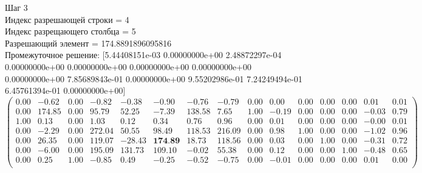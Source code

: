 \documentclass{article}
\begin{document}
\begin{flushleft}
    Шаг 3\\
    Индекс разрешающей строки = 4\\
    Индекс разрещающего столбца = 5\\
    Разрешающий элемент = 174.8891896095816\\
    Промежуточное решение:
    [5.44408151e-03 0.00000000e+00 2.48872297e-04 0.00000000e+00
    0.00000000e+00 0.00000000e+00 0.00000000e+00 0.00000000e+00
    7.85689843e-01 0.00000000e+00 9.55202986e-01 7.24249494e-01
    6.45761394e-01 0.00000000e+00]
\begin{equation*}
\begin{pmatrix}
 0.00 &  -0.62 & 0.00 &  -0.82 &  -0.38 &  -0.90 &  -0.76 &  -0.79 & 0.00 &  0.00 & 0.00 & 0.00 & 0.00 &  0.01 & 0.01 \\
 0.00 & 174.85 & 0.00 &  95.79 &  52.25 &  -7.39 & 138.58 &   7.65 & 1.00 & -0.19 & 0.00 & 0.00 & 0.00 & -0.03 & 0.79 \\
 1.00 &   0.13 & 0.00 &   1.03 &   0.12 &   0.34 &   0.76 &   0.96 & 0.00 &  0.01 & 0.00 & 0.00 & 0.00 & -0.00 & 0.01 \\
 0.00 &  -2.29 & 0.00 & 272.04 &  50.55 &  98.49 & 118.53 & 216.09 & 0.00 &  0.98 & 1.00 & 0.00 & 0.00 & -1.02 & 0.96 \\
 0.00 &  26.35 & 0.00 & 119.07 & -28.43 & \textbf{174.89} &  18.73 & 118.56 & 0.00 &  0.03 & 0.00 & 1.00 & 0.00 & -0.31 & 0.72 \\
 0.00 &  -6.00 & 0.00 & 195.09 & 131.73 & 109.10 &  -0.02 &  55.38 & 0.00 &  0.12 & 0.00 & 0.00 & 1.00 & -0.48 & 0.65 \\
 0.00 &   0.25 & 1.00 &  -0.85 &   0.49 &  -0.25 &  -0.52 &  -0.75 & 0.00 & -0.01 & 0.00 & 0.00 & 0.00 &  0.01 & 0.00 \\
\end{pmatrix}
\end{equation*}
\end{flushleft}
\end{document}

